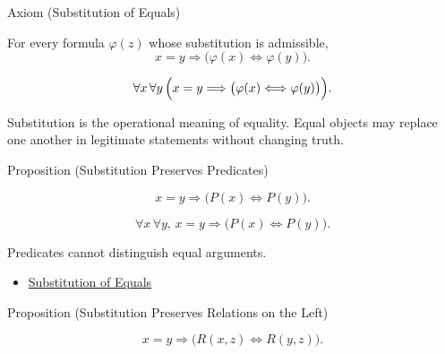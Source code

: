 \begin{axiombox}{Axiom (Substitution of Equals)}
\begin{axiom}
\label{ax:equality-substitution}
For every formula $\varphi(z)$ whose substitution is admissible,
\[
x=y \Longrightarrow \bigl(\varphi(x)\Longleftrightarrow\varphi(y)\bigr).
\]
\end{axiom}
\end{axiombox}

\begin{remark*}
\[
\forall x\,\forall y\,
\Bigl(x=y \Longrightarrow
\bigl(\varphi(x)\Longleftrightarrow\varphi(y)\bigr)\Bigr).
\]
\end{remark*}

\begin{remark*}[Interpretation]
Substitution is the operational meaning of equality. Equal objects may replace
one another in legitimate statements without changing truth.
\end{remark*}

\NoLocalDependencies

\begin{propositionbox}{Proposition (Substitution Preserves Predicates)}
\begin{proposition}
\label{prop:substitution-preserves-predicates}
\[
x=y \Longrightarrow \bigl(P(x)\Longleftrightarrow P(y)\bigr).
\]
\end{proposition}
\end{propositionbox}

\begin{remark*}
\[
\forall x\,\forall y,\,
x=y \Longrightarrow \bigl(P(x)\Longleftrightarrow P(y)\bigr).
\]
\end{remark*}

\begin{remark*}[Interpretation]
Predicates cannot distinguish equal arguments.
\end{remark*}

\begin{dependencies}
\begin{itemize}
  \item \hyperref[ax:equality-substitution]{Substitution of Equals}
\end{itemize}
\end{dependencies}

\begin{propositionbox}{Proposition (Substitution Preserves Relations on the Left)}
\begin{proposition}
\label{prop:substitution-preserves-relations-left}
\[
x=y \Longrightarrow \bigl(R(x,z)\Longleftrightarrow R(y,z)\bigr).
\]
\end{proposition}
\end{propositionbox}

